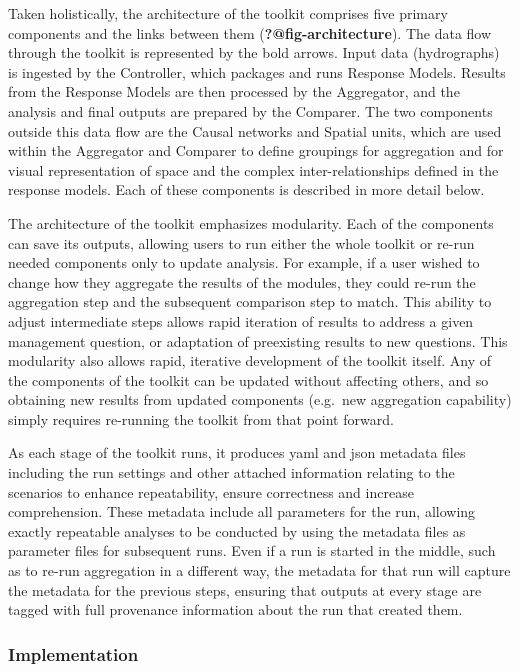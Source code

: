 \documentclass[
  number]{elsarticle}
\begin{document}
Taken holistically, the architecture of the toolkit comprises five
primary components and the links between them
(\textbf{?@fig-architecture}). The data flow through the toolkit is
represented by the bold arrows. Input data (hydrographs) is ingested by
the Controller, which packages and runs Response Models. Results from
the Response Models are then processed by the Aggregator, and the
analysis and final outputs are prepared by the Comparer. The two
components outside this data flow are the Causal networks and Spatial
units, which are used within the Aggregator and Comparer to define
groupings for aggregation and for visual representation of space and the
complex inter-relationships defined in the response models. Each of
these components is described in more detail below.

The architecture of the toolkit emphasizes modularity. Each of the
components can save its outputs, allowing users to run either the whole
toolkit or re-run needed components only to update analysis. For
example, if a user wished to change how they aggregate the results of
the modules, they could re-run the aggregation step and the subsequent
comparison step to match. This ability to adjust intermediate steps
allows rapid iteration of results to address a given management
question, or adaptation of preexisting results to new questions. This
modularity also allows rapid, iterative development of the toolkit
itself. Any of the components of the toolkit can be updated without
affecting others, and so obtaining new results from updated components
(e.g.~new aggregation capability) simply requires re-running the toolkit
from that point forward.

As each stage of the toolkit runs, it produces yaml and json metadata
files including the run settings and other attached information relating
to the scenarios to enhance repeatability, ensure correctness and
increase comprehension. These metadata include all parameters for the
run, allowing exactly repeatable analyses to be conducted by using the
metadata files as parameter files for subsequent runs. Even if a run is
started in the middle, such as to re-run aggregation in a different way,
the metadata for that run will capture the metadata for the previous
steps, ensuring that outputs at every stage are tagged with full
provenance information about the run that created them.

\hypertarget{implementation}{%
\subsubsection{Implementation}\label{implementation}}
\end{document}
